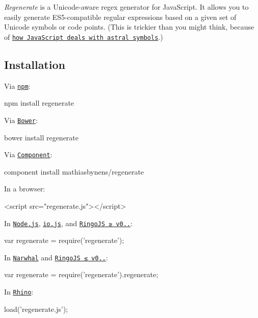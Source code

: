{\itshape Regenerate} is a Unicode-\/aware regex generator for Java\+Script. It allows you to easily generate E\+S5-\/compatible regular expressions based on a given set of Unicode symbols or code points. (This is trickier than you might think, because of \href{https://mathiasbynens.be/notes/javascript-unicode}{\tt how Java\+Script deals with astral symbols}.)

\subsection*{Installation}

Via \href{https://npmjs.org/}{\tt npm}\+:


\begin{DoxyCode}
npm install regenerate
\end{DoxyCode}


Via \href{http://bower.io/}{\tt Bower}\+:


\begin{DoxyCode}
bower install regenerate
\end{DoxyCode}


Via \href{https://github.com/component/component}{\tt Component}\+:


\begin{DoxyCode}
component install mathiasbynens/regenerate
\end{DoxyCode}


In a browser\+:


\begin{DoxyCode}
<script src="regenerate.js"></script>
\end{DoxyCode}


In \href{https://nodejs.org/}{\tt Node.\+js}, \href{https://iojs.org/}{\tt io.\+js}, and \href{http://ringojs.org/}{\tt Ringo\+JS ≥ v0..}\+:


\begin{DoxyCode}
var regenerate = require('regenerate');
\end{DoxyCode}


In \href{http://narwhaljs.org/}{\tt Narwhal} and \href{http://ringojs.org/}{\tt Ringo\+JS ≤ v0..}\+:


\begin{DoxyCode}
var regenerate = require('regenerate').regenerate;
\end{DoxyCode}


In \href{http://www.mozilla.org/rhino/}{\tt Rhino}\+:


\begin{DoxyCode}
load('regenerate.js');
\end{DoxyCode}


